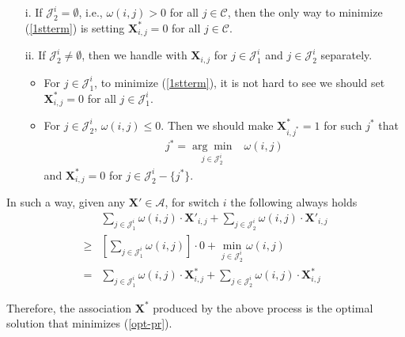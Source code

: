 \documentclass[10pt,journal,compsoc]{IEEEtran}
\begin{document}
\begin{itemize}
	\item[i.] If $\mathcal{J}^i_2 = \emptyset$, i.e., $\omega(i,j) > 0$ for all $j \in \mathcal{C}$, then the only way to minimize (\ref{1stterm}) is setting $\mathbf{X}^*_{i,j} = 0$ for all $j \in \mathcal{C}$. 
	\item[ii.] If $\mathcal{J}^i_2 \neq \emptyset$, then we handle with $\mathbf{X}_{i,j}$ for $j \in \mathcal{J}^i_1$ and $j \in \mathcal{J}^i_2$ separately.
	\begin{itemize}
		\item For $j \in \mathcal{J}^i_1$, to minimize (\ref{1stterm}), it is not hard to see we should set $\mathbf{X}^*_{i,j} = 0$ for all $j \in \mathcal{J}^i_1$.\\
		\item For $j \in \mathcal{J}^i_2$, $\omega(i,j) \le 0$.  Then we should make $\mathbf{X}^*_{i,j^*} = 1$ for such $j^*$ that
		\begin{equation}
			\begin{array}{cl}
				j^* = \underset{j \in \mathcal{J}^i_2}{\arg \min} & \omega(i,j)
			\end{array}
		\end{equation} 
	 and $\mathbf{X}^*_{i,j} = 0$ for $j \in \mathcal{J}^i_2-\{j^*\}$. 
	\end{itemize}
\end{itemize}
	 
In such a way, given any $\mathbf{X}' \in \mathcal{A}$, for switch $i$ the following always holds
		\begin{equation}
			\begin{array}{cl}
				& \displaystyle \sum_{j\in\mathcal{J}^{i}_1} \omega(i,j) \cdot \mathbf{X}'_{i,j} + 
				\displaystyle \sum_{j\in\mathcal{J}^{i}_2} \omega(i,j) \cdot \mathbf{X}'_{i,j} \\ 
			    \ge & \displaystyle \left[ \sum_{j\in\mathcal{J}^{i}_1} \omega(i,j) \right] \cdot 0 + \underset{j \in \mathcal{J}^i_2}{\min} \omega(i,j) \\
				= & \displaystyle \sum_{j\in\mathcal{J}^{i}_1} \omega(i,j) \cdot \mathbf{X}^*_{i,j} + 
				\sum_{j\in\mathcal{J}^{i}_2} \omega(i,j) \cdot \mathbf{X}^*_{i,j}
			\end{array}
		\end{equation}

Therefore, the association $\mathbf{X}^{*}$ produced by the above process is the optimal solution that minimizes (\ref{opt-pr}). 
\end{document}
